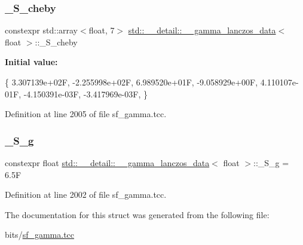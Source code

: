 \subsubsection{\texorpdfstring{\+\_\+\+S\+\_\+cheby}{\_S\_cheby}}
{\footnotesize\ttfamily constexpr std\+::array$<$float, 7$>$ \hyperlink{structstd_1_1____detail_1_1____gamma__lanczos__data}{std\+::\+\_\+\+\_\+detail\+::\+\_\+\+\_\+gamma\+\_\+lanczos\+\_\+data}$<$ float $>$\+::\+\_\+\+S\+\_\+cheby\hspace{0.3cm}{\ttfamily [static]}}

{\bfseries Initial value\+:}
\begin{DoxyCode}
\{
     3.307139e+02F,
    -2.255998e+02F,
     6.989520e+01F,
    -9.058929e+00F,
     4.110107e-01F,
    -4.150391e-03F,
    -3.417969e-03F,
      \}
\end{DoxyCode}


Definition at line 2005 of file sf\+\_\+gamma.\+tcc.

\mbox{\label{structstd_1_1____detail_1_1____gamma__lanczos__data_3_01float_01_4_aadc6da66fb542d6b88ddf3a0aef6249c}} 
\subsubsection{\texorpdfstring{\+\_\+\+S\+\_\+g}{\_S\_g}}
{\footnotesize\ttfamily constexpr float \hyperlink{structstd_1_1____detail_1_1____gamma__lanczos__data}{std\+::\+\_\+\+\_\+detail\+::\+\_\+\+\_\+gamma\+\_\+lanczos\+\_\+data}$<$ float $>$\+::\+\_\+\+S\+\_\+g = 6.\+5F\hspace{0.3cm}{\ttfamily [static]}}



Definition at line 2002 of file sf\+\_\+gamma.\+tcc.



The documentation for this struct was generated from the following file\+:\begin{DoxyCompactItemize}
\item 
bits/\hyperlink{sf__gamma_8tcc}{sf\+\_\+gamma.\+tcc}\end{DoxyCompactItemize}
